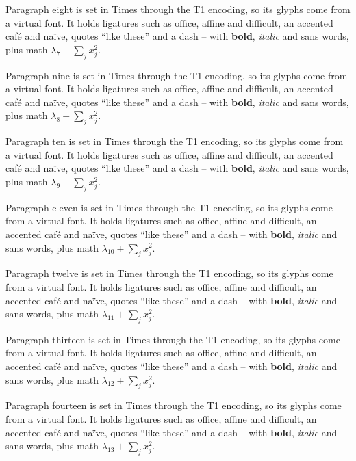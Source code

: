 \documentclass{article}
\begin{document}
Paragraph eight is set in Times through the T1 encoding, so its glyphs come from a virtual font.
It holds ligatures such as office, affine and difficult, an accented caf\'e and na\"ive, quotes ``like these''
and a dash -- with {\bfseries bold}, {\itshape italic} and {\sffamily sans} words, plus math $\lambda_7 + \sum_j x_j^2$.

Paragraph nine is set in Times through the T1 encoding, so its glyphs come from a virtual font.
It holds ligatures such as office, affine and difficult, an accented caf\'e and na\"ive, quotes ``like these''
and a dash -- with {\bfseries bold}, {\itshape italic} and {\sffamily sans} words, plus math $\lambda_8 + \sum_j x_j^2$.

Paragraph ten is set in Times through the T1 encoding, so its glyphs come from a virtual font.
It holds ligatures such as office, affine and difficult, an accented caf\'e and na\"ive, quotes ``like these''
and a dash -- with {\bfseries bold}, {\itshape italic} and {\sffamily sans} words, plus math $\lambda_9 + \sum_j x_j^2$.

Paragraph eleven is set in Times through the T1 encoding, so its glyphs come from a virtual font.
It holds ligatures such as office, affine and difficult, an accented caf\'e and na\"ive, quotes ``like these''
and a dash -- with {\bfseries bold}, {\itshape italic} and {\sffamily sans} words, plus math $\lambda_10 + \sum_j x_j^2$.

Paragraph twelve is set in Times through the T1 encoding, so its glyphs come from a virtual font.
It holds ligatures such as office, affine and difficult, an accented caf\'e and na\"ive, quotes ``like these''
and a dash -- with {\bfseries bold}, {\itshape italic} and {\sffamily sans} words, plus math $\lambda_11 + \sum_j x_j^2$.

Paragraph thirteen is set in Times through the T1 encoding, so its glyphs come from a virtual font.
It holds ligatures such as office, affine and difficult, an accented caf\'e and na\"ive, quotes ``like these''
and a dash -- with {\bfseries bold}, {\itshape italic} and {\sffamily sans} words, plus math $\lambda_12 + \sum_j x_j^2$.

Paragraph fourteen is set in Times through the T1 encoding, so its glyphs come from a virtual font.
It holds ligatures such as office, affine and difficult, an accented caf\'e and na\"ive, quotes ``like these''
and a dash -- with {\bfseries bold}, {\itshape italic} and {\sffamily sans} words, plus math $\lambda_13 + \sum_j x_j^2$.
\end{document}
